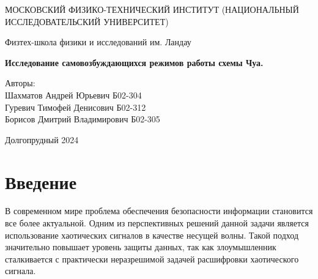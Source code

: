 \documentclass[12pt]{article}
\date{\today}
\begin{document}
\begin{titlepage}
	\begin{center}
		{\large МОСКОВСКИЙ ФИЗИКО-ТЕХНИЧЕСКИЙ ИНСТИТУТ (НАЦИОНАЛЬНЫЙ ИССЛЕДОВАТЕЛЬСКИЙ УНИВЕРСИТЕТ)}
	\end{center}
	\begin{center}
		{\large Физтех-школа физики и исследований им. Ландау}
	\end{center}

	\vspace{3cm}
	{\huge
		\begin{center}
			\textbf{Исследование самовозбуждающихся режимов работы схемы Чуа.}
		\end{center}
	}
	\vspace{2cm}
	\begin{flushright}
        {\LARGE Авторы:\\
        Шахматов Андрей Юрьевич Б02-304 \\
        Гуревич Тимофей Денисович Б02-312 \\
        Борисов Дмитрий Владимирович Б02-305 \\
		}
    \end{flushright}
	\vspace{7 cm}
	\begin{center}
		Долгопрудный 2024
	\end{center}
	\thispagestyle{empty}
\end{titlepage}


\begin{abstract}
	Исследованы самовозбуждающиеся режимы работы схемы Чуа. Получена качественная теоретическая модель 
	режимов работы схемы Чуа. Численно промоделировано поведение схемы при различных бифуркационных 
	параметрах. Проведён анализ полученных состояний. Собран прототип схемы Чуа на основе операционных усилителей, 
	сопротивлений и конденсаторов. Исследована бифуркационная диаграмма схемы на реальном прототипе. Проведён сравнительный 
	анализ полученных результатов. Определены возможные причины расхождения теоретической модели и эксперимента. 
\end{abstract}


\section*{Введение} 
В современном мире проблема обеспечения безопасности информации становится все более актуальной.
Одним из перспективных решений данной задачи является использование хаотических сигналов в качестве несущей волны.
Такой подход значительно повышает уровень защиты данных,
так как злоумышленник сталкивается с практически неразрешимой задачей расшифровки хаотического сигнала.
\end{document}
